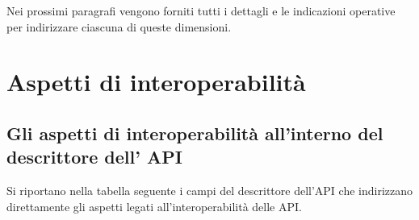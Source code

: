 \documentclass[letterpaper,10pt,italian]{sphinxmanual}
\begin{document}
Nei prossimi paragrafi vengono forniti tutti i dettagli e le indicazioni operative per indirizzare ciascuna di queste dimensioni.


\section{Aspetti di interoperabilità}
\label{\detokenize{sez21:aspetti-di-interoperabilita}}\label{\detokenize{sez21:sezione21}}\label{\detokenize{sez21::doc}}



\subsection{Gli aspetti di interoperabilità all’interno del descrittore dell’ API}
\label{\detokenize{sez21:gli-aspetti-di-interoperabilita-allinterno-del-descrittore-dell-api}}\label{\detokenize{sez21:sezione211}}
Si riportano nella tabella seguente i campi del descrittore dell’API che indirizzano direttamente gli aspetti legati all’interoperabilità delle API.
\end{document}
